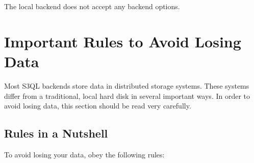 \documentclass[letterpaper,10pt,english]{sphinxmanual}
\begin{document}
The local backend does not accept any backend options.


\chapter{Important Rules to Avoid Losing Data}
\label{durability::doc}\label{durability:sshfs}\label{durability:durability}\label{durability:important-rules-to-avoid-losing-data}
Most S3QL backends store data in distributed storage systems. These
systems differ from a traditional, local hard disk in several
important ways. In order to avoid losing data, this section should be
read very carefully.


\section{Rules in a Nutshell}
\label{durability:rules-in-a-nutshell}
To avoid losing your data, obey the following rules:
\end{document}
